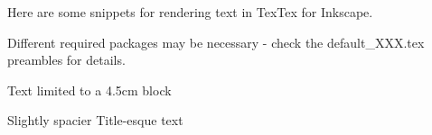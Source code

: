 Here are some snippets for rendering text in TexTex for Inkscape.

Different required packages may be necessary - check the default_XXX.tex preambles for details.



\begin{minipage}{4.5cm}
Text limited to a 4.5cm block
\end{minipage}

\centering %


\huge

\color[RGB]{33, 49, 77}





{
Slightly spacier Title-esque text
}
